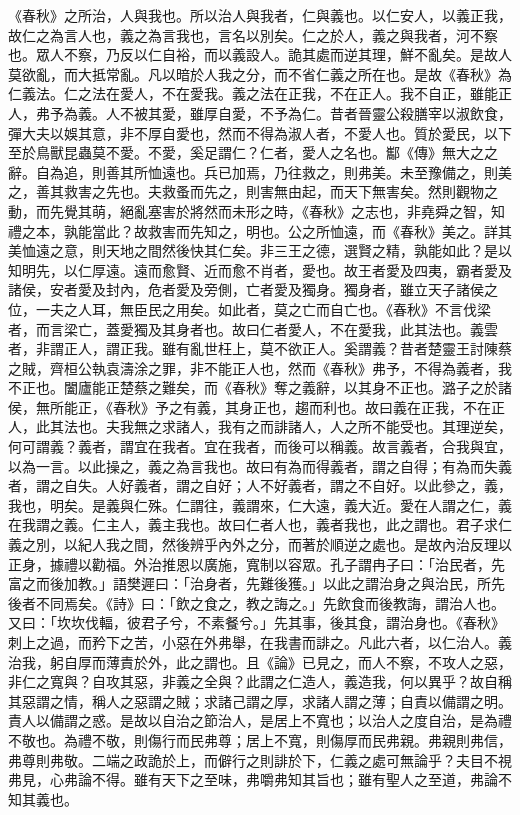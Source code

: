 
《春秋》之所治，人與我也。所以治人與我者，仁與義也。以仁安人，以義正我，故仁之為言人也，義之為言我也，言名以別矣。仁之於人，義之與我者，河不察也。眾人不察，乃反以仁自裕，而以義設人。詭其處而逆其理，鮮不亂矣。是故人莫欲亂，而大抵常亂。凡以暗於人我之分，而不省仁義之所在也。是故《春秋》為仁義法。仁之法在愛人，不在愛我。義之法在正我，不在正人。我不自正，雖能正人，弗予為義。人不被其愛，雖厚自愛，不予為仁。昔者晉靈公殺膳宰以淑飲食，彈大夫以娛其意，非不厚自愛也，然而不得為淑人者，不愛人也。質於愛民，以下至於鳥獸昆蟲莫不愛。不愛，奚足謂仁？仁者，愛人之名也。酅《傳》無大之之辭。自為追，則善其所恤遠也。兵已加焉，乃往救之，則弗美。未至豫備之，則美之，善其救害之先也。夫救蚤而先之，則害無由起，而天下無害矣。然則觀物之動，而先覺其萌，絕亂塞害於將然而未形之時，《春秋》之志也，非堯舜之智，知禮之本，孰能當此？故救害而先知之，明也。公之所恤遠，而《春秋》美之。詳其美恤遠之意，則天地之間然後快其仁矣。非三王之德，選賢之精，孰能如此？是以知明先，以仁厚遠。遠而愈賢、近而愈不肖者，愛也。故王者愛及四夷，霸者愛及諸侯，安者愛及封內，危者愛及旁側，亡者愛及獨身。獨身者，雖立天子諸侯之位，一夫之人耳，無臣民之用矣。如此者，莫之亡而自亡也。《春秋》不言伐梁者，而言梁亡，蓋愛獨及其身者也。故曰仁者愛人，不在愛我，此其法也。義雲者，非謂正人，謂正我。雖有亂世枉上，莫不欲正人。奚謂義？昔者楚靈王討陳蔡之賊，齊桓公執袁濤涂之罪，非不能正人也，然而《春秋》弗予，不得為義者，我不正也。闔廬能正楚蔡之難矣，而《春秋》奪之義辭，以其身不正也。潞子之於諸侯，無所能正，《春秋》予之有義，其身正也，趨而利也。故曰義在正我，不在正人，此其法也。夫我無之求諸人，我有之而誹諸人，人之所不能受也。其理逆矣，何可謂義？義者，謂宜在我者。宜在我者，而後可以稱義。故言義者，合我與宜，以為一言。以此操之，義之為言我也。故曰有為而得義者，謂之自得；有為而失義者，謂之自失。人好義者，謂之自好；人不好義者，謂之不自好。以此參之，義，我也，明矣。是義與仁殊。仁謂往，義謂來，仁大遠，義大近。愛在人謂之仁，義在我謂之義。仁主人，義主我也。故曰仁者人也，義者我也，此之謂也。君子求仁義之別，以紀人我之間，然後辨乎內外之分，而著於順逆之處也。是故內治反理以正身，據禮以勸福。外治推恩以廣施，寬制以容眾。孔子謂冉子曰：「治民者，先富之而後加教。」語樊遲曰：「治身者，先難後獲。」以此之謂治身之與治民，所先後者不同焉矣。《詩》曰：「飲之食之，教之誨之。」先飲食而後教誨，謂治人也。又曰：「坎坎伐輻，彼君子兮，不素餐兮。」先其事，後其食，謂治身也。《春秋》刺上之過，而矜下之苦，小惡在外弗舉，在我書而誹之。凡此六者，以仁治人。義治我，躬自厚而薄責於外，此之謂也。且《論》已見之，而人不察，不攻人之惡，非仁之寬與？自攻其惡，非義之全與？此謂之仁造人，義造我，何以異乎？故自稱其惡謂之情，稱人之惡謂之賊；求諸己謂之厚，求諸人謂之薄；自責以備謂之明。責人以備謂之惑。是故以自治之節治人，是居上不寬也；以治人之度自治，是為禮不敬也。為禮不敬，則傷行而民弗尊；居上不寬，則傷厚而民弗親。弗親則弗信，弗尊則弗敬。二端之政詭於上，而僻行之則誹於下，仁義之處可無論乎？夫目不視弗見，心弗論不得。雖有天下之至味，弗嚼弗知其旨也；雖有聖人之至道，弗論不知其義也。

